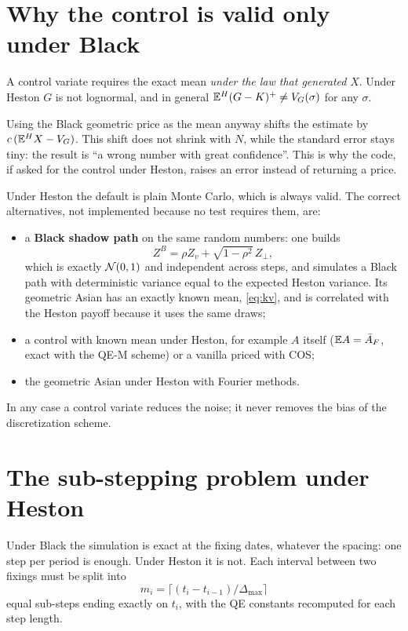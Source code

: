 \section{Why the control is valid only under Black}
A control variate requires the exact mean \emph{under the law that generated} $X$. Under Heston $G$ is not lognormal,
and in general $\mathbb{E}^H(G-K)^+\ne V_G(\sigma)$ for any $\sigma$.
\begin{attenzione}
Using the Black geometric price as the mean anyway shifts the estimate by $c\,(\mathbb{E}^HX-V_G)$. This shift does not
shrink with $N$, while the standard error stays tiny: the result is ``a wrong number with great confidence''. This is
why the code, if asked for the control under Heston, raises an error instead of returning a price.
\end{attenzione}
Under Heston the default is plain Monte Carlo, which is always valid. The correct alternatives, not implemented
because no test requires them, are:
\begin{itemize}
\item a \textbf{Black shadow path} on the same random numbers: one builds
\[
Z^B=\rho Z_v+\sqrt{1-\rho^2}\,Z_\perp ,
\]
which is exactly $\mathcal{N}(0,1)$ and independent across steps, and simulates a Black path with deterministic variance equal
to the expected Heston variance. Its geometric Asian has an exactly known mean, \eqref{eq:kv}, and is correlated with
the Heston payoff because it uses the same draws;
\item a control with known mean under Heston, for example $A$ itself ($\mathbb{E} A=\bar A_F$, exact with the QE-M scheme) or
a vanilla priced with COS;
\item the geometric Asian under Heston with Fourier methods.
\end{itemize}
In any case a control variate reduces the noise; it never removes the bias of the discretization scheme.

\section{The sub-stepping problem under Heston}
Under Black the simulation is exact at the fixing dates, whatever the spacing: one step per period is enough. Under
Heston it is not. Each interval between two fixings must be split into
\[
m_i=\big\lceil(t_i-t_{i-1})/\Delta_{\max}\big\rceil
\]
equal sub-steps ending exactly on $t_i$, with the QE constants recomputed for each step length.

